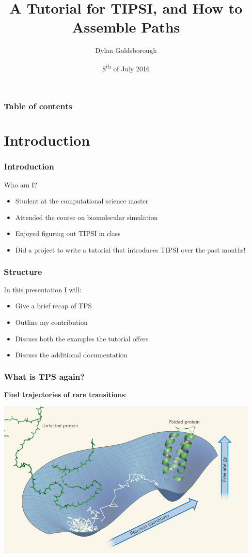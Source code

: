 \documentclass[hyperref={pdfpagelabels=false}]{beamer}
\title{A Tutorial for \textsc{TIPSI}, and How to Assemble Paths}
\author{Dylan Goldsborough}
\date{8\textsuperscript{th} of July 2016}
\begin{document}
\begin{frame}
\titlepage
\end{frame} 

\begin{frame}
\frametitle{Table of contents}
\tableofcontents
\end{frame} 


\section{Introduction} 
\setcounter{subsection}{1}
\begin{frame}
\frametitle{Introduction}
Who am I?
\begin{itemize}
\item Student at the computational science master
\item Attended the course on biomolecular simulation
\item Enjoyed figuring out \textsc{TIPSI} in class
\item Did a project to write a tutorial that introduces \textsc{TIPSI} over the past months!
\end{itemize}
\end{frame}

\begin{frame}
\frametitle{Structure}
In this presentation I will:
\begin{itemize}
\item Give a brief recap of TPS
\item Outline my contribution
\item Discuss both the examples the tutorial offers
\item Discuss the additional documentation
\end{itemize} 
\end{frame}

\begin{frame}
\frametitle{What is TPS again?}
\textbf{Find trajectories of rare transitions}:
\begin{center}
\includegraphics[scale=0.3]{images/fold.png}
\end{center}
\end{frame}
\end{document}

